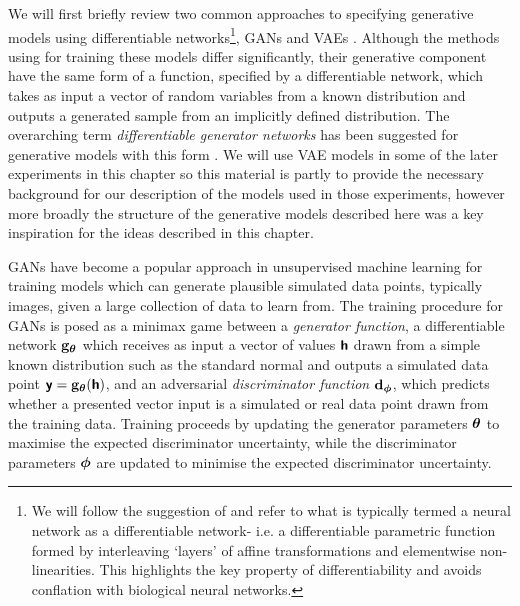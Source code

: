 \begin{figure}[!t]
\label{fig:gan-and-vae-factor-graphs}
\end{figure}

We will first briefly review two common approaches to specifying generative models using differentiable networks\footnote{We will follow the suggestion of \citep{zadeh2016twitter} and refer to what is typically termed a neural network as a differentiable network- i.e. a differentiable parametric function formed by interleaving `layers' of affine transformations and elementwise non-linearities. This highlights the key property of differentiability and avoids conflation with biological neural networks.}, \acfp{GAN} \citep{goodfellow2014generative} and \acfp{VAE} \citep{kingma2013auto,rezende2014stochastic}. Although the methods using for training these models differ significantly, their generative component have the same form of a function, specified by a differentiable network, which takes as input a vector of random variables from a known distribution and outputs a generated sample from an implicitly defined distribution. The overarching term \emph{differentiable generator networks} has been suggested for generative models with this form \citep{goodfellow2016deep}. We will use \ac{VAE} models in some of the later experiments in this chapter so this material is partly to provide the necessary background for our description of the models used in those experiments, however more broadly the structure of the generative models described here was a key inspiration for the ideas described in this chapter.

\acp{GAN} \citep{goodfellow2014generative} have become a popular approach in unsupervised machine learning for training models which can generate plausible simulated data points, typically images, given a large collection of data to learn from. The training procedure for \acp{GAN} is posed as a minimax game between a \emph{generator function}, a differentiable network ${\mathbf{g}}_{\boldsymbol{\theta}}$ which receives as input a vector of values $\boldsymbol{\mathsf{h}}$ drawn from a simple known distribution such as the standard normal and outputs a simulated data point $\boldsymbol{\mathsf{y}} = {\mathbf{g}}_{\boldsymbol{\theta}}(\boldsymbol{\mathsf{h}})$, and an adversarial \emph{discriminator function} ${\mathbf{d}}_{\boldsymbol{\phi}}$, which predicts whether a presented vector input is a simulated or real data point drawn from the training data.  Training proceeds by updating the generator parameters $\boldsymbol{\theta}$ to maximise the expected discriminator uncertainty, while the discriminator parameters $\boldsymbol{\phi}$ are updated to minimise the expected discriminator uncertainty.


